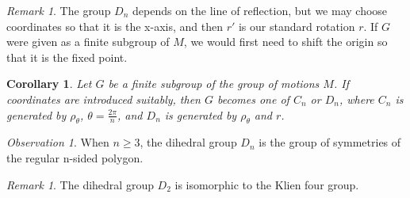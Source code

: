 \documentclass[12pt]{article}
\newtheorem{cor}[thm]{Corollary}
\theoremstyle{definition}
\theoremstyle{remark}
\newtheorem{rmk}[thm]{Remark}
\newtheorem{obs}[thm]{Observation}
\numberwithin{equation}{section}
\begin{document}
\vspace{15pt}

\begin{rmk}
        The group $D_n$ depends on the line of reflection, but we may choose coordinates so that it is the x-axis, and then $r'$ is our standard rotation $r$. If $G$ were given as a finite subgroup of $M$, we would first need to shift the origin so that it is the fixed point.
\end{rmk}

\vspace{15pt}

\begin{cor}
        Let $G$ be a finite subgroup of the group of motions $M$. If coordinates are introduced suitably, then $G$ becomes one of $C_n$ or $D_n$, where $C_n$ is generated by $\rho_{\theta}$, $\theta =\frac{2\pi}{n}$, and $D_n$ is generated by $\rho_{\theta}$ and $r$.
\end{cor}

\vspace{15pt}

\begin{obs}
        When $n \geq 3$, the dihedral group $D_n$ is the group of symmetries of the regular n-sided polygon.
\end{obs}

\vspace{15pt}

\begin{rmk}
        The dihedral group $D_2$ is isomorphic to the Klien four group.
\end{rmk}

\vspace{15pt}
\end{document}

